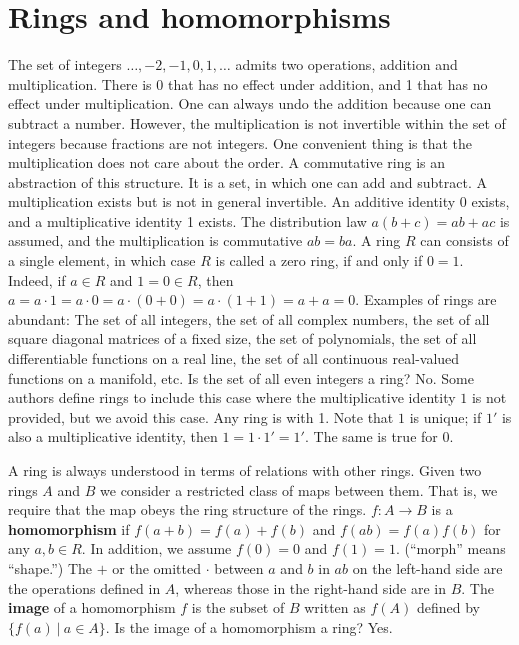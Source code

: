 \section{Rings and homomorphisms}

The set of integers $\ldots, -2,-1,0,1,\ldots$ admits two operations, addition and multiplication.
There is 0 that has no effect under addition, and 1 that has no effect under multiplication.
One can always undo the addition because one can subtract a number.
However, the multiplication is not invertible within the set of integers
because fractions are not integers.
One convenient thing is that the multiplication does not care about the order.
A commutative ring is an abstraction of this structure.
It is a set, in which one can add and subtract. A multiplication exists but is not in general invertible.
An additive identity 0 exists, and a multiplicative identity 1 exists.
The distribution law $a(b+c) = ab + ac$ is assumed,
and the multiplication is commutative $ab = ba$.
A ring $R$ can consists of a single element, in which case $R$ is called a zero ring, if and only if $0=1$.
Indeed, if $a \in R$ and $1 = 0 \in R$, then $a = a \cdot 1 = a \cdot 0 = a \cdot ( 0 + 0 ) = a \cdot (1+1) = a + a = 0$.
Examples of rings are abundant: The set of all integers, the set of all complex numbers, the set of all square diagonal matrices of  a fixed size,
the set of polynomials, the set of all differentiable functions on a real line, the set of all continuous real-valued functions on a manifold, etc.
Is the set of all even integers a ring? 
No. Some authors define rings to include this case where the multiplicative identity $1$ is not provided,
but we avoid this case. Any ring is with 1.
Note that $1$ is unique; if $1'$ is also a multiplicative identity, then $1 = 1 \cdot 1' = 1'$.
The same is true for $0$.

A ring is always understood in terms of relations with other rings.
Given two rings $A$ and $B$ we consider a restricted class of maps between them.
That is, we require that the map obeys the ring structure of the rings.
$f : A \to B$ is a {\bf homomorphism} if $f(a+b) = f(a) + f(b)$ and $f(ab) = f(a)f(b)$ for any $a,b \in R$.
In addition, we assume $f(0) = 0$ and $f(1) = 1$.
(``morph'' means ``shape.'') 
The $+$ or the omitted $\cdot$ between $a$ and $b$ in $ab$ on the left-hand side
are the operations defined in $A$, whereas those in the right-hand side are in $B$.
The {\bf image} of a homomorphism $f$ is the subset of $B$ written as $f(A)$ defined by $\{ f(a) ~|~ a \in A \}$.
Is the image of a homomorphism a ring? Yes.

